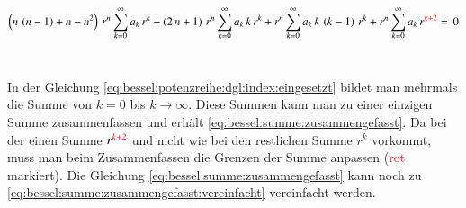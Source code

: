 \begin{align}
	\left(
	n \, \left( n - 1 \right)
	+
	n
	-
	n^2
	\right)
	\, r^{n}
	\sum_{k=0}^{\infty} a_k \, r^k
	+
	\left(	
	2 \, n
	+
	1
	\right)
	\, r^{n}
	\sum_{k=0}^{\infty} a_k \, k \, r^k
	+
	r^{n}
	\sum_{k=0}^{\infty} a_k \, k \, \left( k - 1 \right) \, r^k
	+
	r^{n}
	\sum_{k=0}^{\infty} a_k \, r^{\textcolor{red}{k + 2}}
	= \, 0
	\label{eq:bessel:potenzreihe:dgl:index:eingesetzt}
\end{align}
\\
\begin{normalsize}
	In der Gleichung \ref{eq:bessel:potenzreihe:dgl:index:eingesetzt} bildet man mehrmals die Summe von $k=0$ bis $k \rightarrow \infty$.
	Diese Summen kann man zu einer einzigen Summe zusammenfassen und erh\"alt \ref{eq:bessel:summe:zusammengefasst}.
	Da bei der einen Summe $r^{\textcolor{red}{k+2}}$ und nicht wie bei den restlichen Summe $r^k$ vorkommt,
	muss man beim Zusammenfassen die Grenzen der Summe anpassen (\textcolor{red}{rot} markiert).
	Die Gleichung \ref{eq:bessel:summe:zusammengefasst} kann noch zu \ref{eq:bessel:summe:zusammengefasst:vereinfacht} vereinfacht werden.
\end{normalsize}

